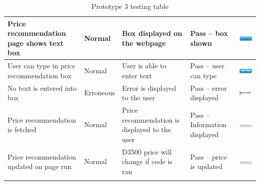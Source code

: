 \begin{center}
\begin{longtable}{|P{17mm}|P{17mm}|P{16mm}|P{17mm}|P{60mm}|}
Price recommendation page shows text box & Normal & Box displayed on the
webpage & Pass -- box shown &
\includegraphics[width=58mm]{ch3_developing/proto3/media/image36.png} \\ \hline
User can type in price recommendation box & Normal & User is able to
enter text & Pass -- user can type &
\includegraphics[width=58mm]{ch3_developing/proto3/media/image37.png} \\ \hline
No text is entered into box & Erroneous & Error is displayed to the user
& Pass -- error displayed &
\includegraphics[width=58mm]{ch3_developing/proto3/media/image38.png} \\ \hline
Price recommendation is fetched & Normal & Price recommendation is
displayed to the user & Pass -- Information displayed &
\includegraphics[width=58mm]{ch3_developing/proto3/media/image39.png} \\ \hline
Price recommendation updated on page run & Normal & D3500 price will
change if code is ran & Pass -- price is updated &
\includegraphics[width=58mm]{ch3_developing/proto3/media/image40.png} \\ \hline

    \caption{Prototype 3 testing table}
\label{tab:proto3_testing}
\end{longtable}
\end{center}

